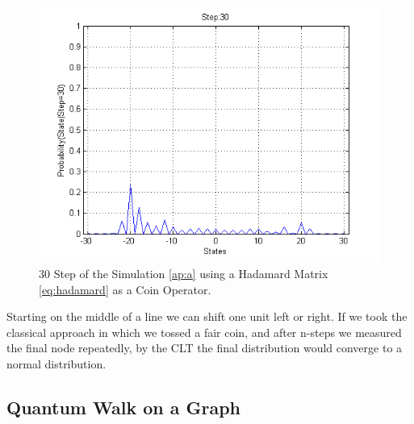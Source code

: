 \begin{figure}[h]
\centering 
\includegraphics[scale=0.50]{Figures/quantum_walk_line_hadamard.png}
\caption{30 Step of the Simulation \ref{ap:a} using a Hadamard Matrix \ref{eq:hadamard} as a Coin Operator.}
\label{fig:qwl_hadamard}
\end{figure}

Starting on the middle of a line we can shift one unit left or right.
If we took the classical approach in which we tossed a fair coin, and after n-steps we measured the final node repeatedly, by the \ac{CLT} the final distribution would converge to a normal distribution.

\subsection{Quantum Walk on a Graph}
\label{subsec:quantum_walk_graph}

